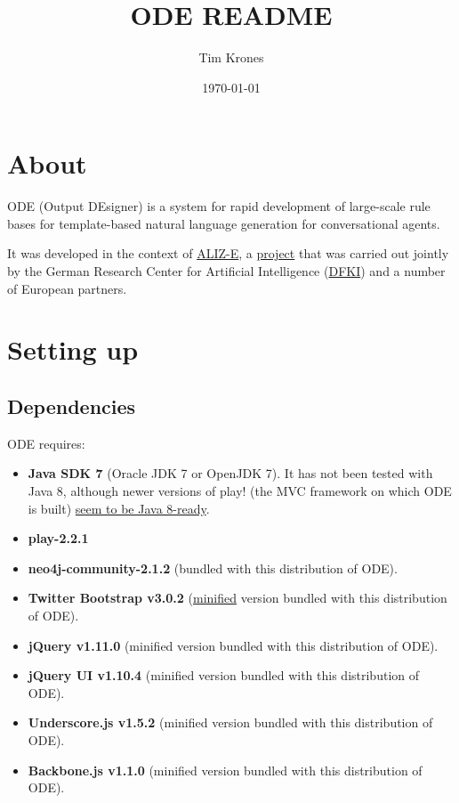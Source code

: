 \documentclass[11pt]{article}
\author{Tim Krones}
\date{\today}
\title{ODE README}
\begin{document}
\maketitle
\tableofcontents


\section{About}
\label{sec-1}
ODE (Output DEsigner) is a system for rapid development of
large-scale rule bases for template-based natural language
generation for conversational agents.

It was developed in the context of \href{http://www.aliz-e.org/}{ALIZ-E}, a \href{http://www.dfki.de/lt/project.php?id=Project_576&l=en}{project} that was
carried out jointly by the German Research Center for Artificial
Intelligence (\href{http://www.dfki.de/}{DFKI}) and a number of European partners.

\section{Setting up}
\label{sec-2}
\subsection{Dependencies}
\label{sec-2-1}
ODE requires:

\begin{itemize}
\item \textbf{Java SDK 7} (Oracle JDK 7 or OpenJDK 7).
It has not been tested with Java 8, although newer versions of
play! (the MVC framework on which ODE is built) \href{https://github.com/playframework/playframework/issues/1220}{seem to be Java 8-ready}.
\item \textbf{play-2.2.1}
\item \textbf{neo4j-community-2.1.2} (bundled with this distribution of ODE).
\item \textbf{Twitter Bootstrap v3.0.2} (\href{https://en.wikipedia.org/wiki/Minification_(programming)}{minified} version bundled with this
distribution of ODE).
\item \textbf{jQuery v1.11.0} (minified version bundled with this distribution
of ODE).
\item \textbf{jQuery UI v1.10.4} (minified version bundled with this
distribution of ODE).
\item \textbf{Underscore.js v1.5.2} (minified version bundled with this
distribution of ODE).
\item \textbf{Backbone.js v1.1.0} (minified version bundled with this
distribution of ODE).
\end{itemize}
\end{document}
